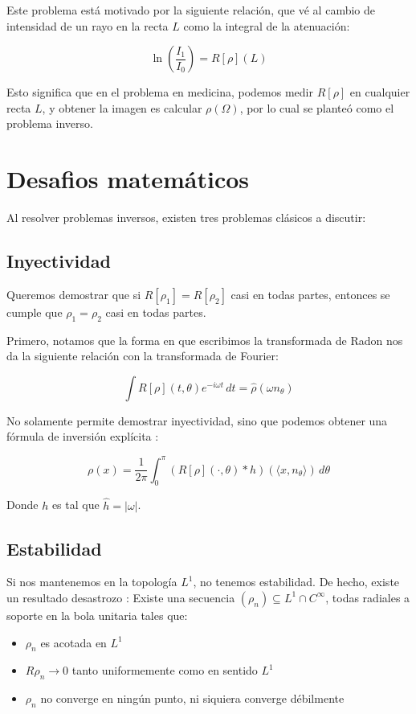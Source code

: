 Este problema está motivado por la siguiente relación, que vé al cambio de intensidad de un rayo en la recta $L$ como la integral de la atenuación:

\[
\ln(\frac{I_1}{I_0}) = R[\rho](L)
\]

Esto significa que en el problema en medicina, podemos medir $R[\rho]$ en cualquier recta $L$, y obtener la imagen es calcular $\rho(\Omega)$, por lo cual se planteó como el problema inverso.

\section{Desafios matemáticos}
Al resolver problemas inversos, existen tres problemas clásicos a discutir:
\subsection{Inyectividad}
Queremos demostrar que si $R[\rho_1] = R[\rho_2]$ casi en todas partes, entonces se cumple que $\rho_1 = \rho_2$ casi en todas partes.

Primero, notamos que la forma en que escribimos la transformada de Radon nos da la siguiente relación con la transformada de Fourier:

\[
\int R[\rho](t, \theta)e^{-i\omega t} \, dt = \hat{\rho}(\omega n_\theta)
\]

No solamente permite demostrar inyectividad, sino que podemos obtener una fórmula de inversión explícita \citep{candes_inverse}:

\[
\rho(x) = \frac{1}{2\pi}\int_0^\pi (R[\rho](\cdot, \theta)*h)(\langle x, n_\theta\rangle)\, d\theta
\]

Donde $h$ es tal que $\hat{h} = |\omega|$. 

\subsection{Estabilidad}
Si nos mantenemos en la topología $L^1$, no tenemos estabilidad. De hecho, existe un resultado desastrozo \citep{herman_natterer_1981}: Existe una secuencia $(\rho_n)\subseteq L^1\cap C^\infty$, todas radiales a soporte en la bola unitaria tales que:

\begin{itemize}
    \item $\rho_n$ es acotada en $L^1$
    \item $R\rho_n\to 0$ tanto uniformemente como en sentido $L^1$
    \item $\rho_n$ no converge en ningún punto, ni siquiera converge débilmente
\end{itemize}

